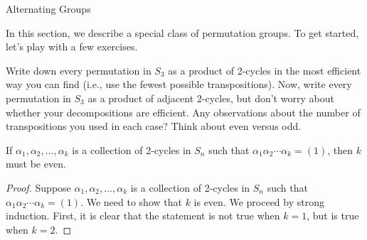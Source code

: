\begin{section}{Alternating Groups}

In this section, we describe a special class of permutation groups.  To get started, let's play with a few exercises.

\begin{problem}
Write down every permutation in $S_3$ as a product of 2-cycles in the most efficient way you can find (i.e., use the fewest possible transpositions).  Now, write every permutation in $S_3$ as a product of adjacent 2-cycles, but don't worry about whether your decompositions are efficient.  Any observations about the number of transpositions you used in each case?  Think about even versus odd.
\end{problem}

\begin{lemma}
If $\alpha_1,\alpha_2,\ldots,\alpha_k$ is a collection of 2-cycles in $S_n$ such that $\alpha_1\alpha_2\cdots\alpha_k=(1)$, then $k$ must be even.
\end{lemma}

\begin{proof}
Suppose $\alpha_1,\alpha_2,\ldots,\alpha_k$ is a collection of 2-cycles in $S_n$ such that $\alpha_1\alpha_2\cdots\alpha_k=(1)$.  We need to show that $k$ is even. We proceed by strong induction. First, it is clear that the statement is not true when $k=1$, but is true when $k=2$. 


\end{proof}
\end{section}
